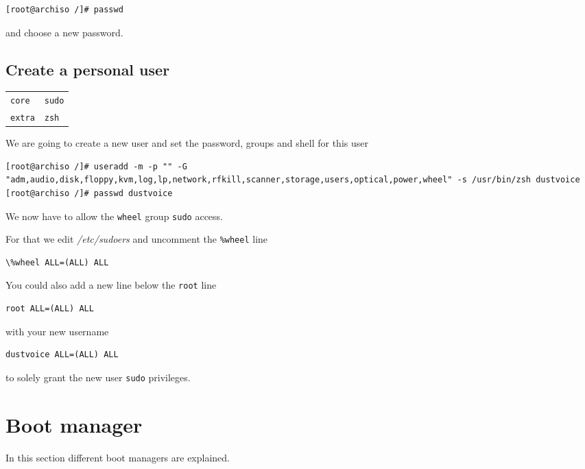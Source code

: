 \documentclass[9pt]{report}
\newenvironment{packagetable}
{\begin{longtabu}to \textwidth [b]{X[1,r]|X[1,l]}}
{\end{longtabu}}
\begin{document}
\begin{verbatim}
[root@archiso /]# passwd
\end{verbatim}

and choose a new password.



\newpage

\hypertarget{x-create-a-personal-user}{\subsection{Create a personal user}}
\begin{packagetable}
    \texttt{core} & \texttt{sudo} \\ 
    \texttt{extra} & \texttt{zsh} \\ 
\end{packagetable}

We are going to create a new user and set the password, groups and shell for this user


\begin{verbatim}
[root@archiso /]# useradd -m -p "" -G "adm,audio,disk,floppy,kvm,log,lp,network,rfkill,scanner,storage,users,optical,power,wheel" -s /usr/bin/zsh dustvoice
[root@archiso /]# passwd dustvoice
\end{verbatim}

We now have to allow the \texttt{wheel} group \texttt{sudo} access.


For that we edit \textit{/etc/sudoers} and uncomment the \texttt{\%wheel} line


\begin{verbatim}
\%wheel ALL=(ALL) ALL
\end{verbatim}

You could also add a new line below the \texttt{root} line


\begin{verbatim}
root ALL=(ALL) ALL
\end{verbatim}

with your new username


\begin{verbatim}
dustvoice ALL=(ALL) ALL
\end{verbatim}

to solely grant the new user \texttt{sudo} privileges.


\hypertarget{x-boot-manager}{\section{Boot manager}}
In this section different boot managers are explained.
\end{document}

